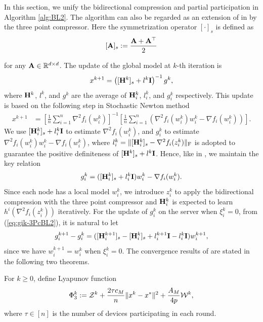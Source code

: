 \documentclass[11pt]{article}
\begin{document}
	
	In this section, we unify the bidirectional compression and partial participation in Algorithm \ref{alg:BL2}. The algorithm can also be regarded as an extension of  in \citep{qian2021basis} by the three point compressor. Here the symmetrization operator $[\cdot]_s$ is defined as
	$$
	[\mathbf{A}]_s \; { := }\; \frac{\mathbf{A} + \mathbf{A}^\top}{2}
	$$
	
	for any $\mathbf{A} \in \mathbb{R}^{d\times d}$. The update of the global model at $k$-th iteration is 
	$$
	x^{k+1} = \left(  [\mathbf{H}^k]_s + l^k\mathbf{I}  \right)^{-1} g^k, 
	$$
	where $\mathbf{H}^k$, $l^k$, and $g^k$ are the average of $\mathbf{H}_i^k$, $l_i^k$, and $g_i^k$ respectively. This update is based on the following step in Stochastic Newton method \citep{SN2019}
	\begin{align*}
		x^{k+1} &= \left[  \tfrac{1}{n} \sum_{i=1}^n \nabla^2 f_i(w_i^k)  \right]^{-1}  \left[  \tfrac{1}{n} \sum_{i=1}^n \left(  \nabla^2 f_i(w_i^k) w_i^k - \nabla f_i(w_i^k)  \right)  \right]. 
	\end{align*}
	We use $[\mathbf{H}_i^k]_s + l_i^k\mathbf{I}$ to estimate $\nabla^2 f_i(w_i^k)$, and $g_i^k$ to estimate $\nabla^2 f_i(w_i^k) w_i^k - \nabla f_i(w_i^k)$, where $l_i^k = \|[\mathbf{H}_i^k]_s-\nabla^2 f_i(z_i^k)\|_{\rm F}$ is adopted to guarantee the positive definiteness of $[\mathbf{H}^k]_s+l^k \mathbf{I}$. Hence, like  in \citep{qian2021basis}, we maintain the key relation 
	\begin{equation}\label{eq:gik-3PcBL2}
		g_i^k = ([\mathbf{H}_i^k]_s + l_i^k\mathbf{I}) w_i^k - \nabla f_i(w_i^k). 
	\end{equation}
	Since each node has a local model $w_i^k$, we introduce $z_i^k$ to apply the bidirectional compression with the three point compressor and $\mathbf{H}_i^k$ is expected to learn $h^i(\nabla^2 f_i(z_i^k))$ iteratively.
	For the update of $g_i^k$ on the server when $\xi_i^k=0$, from (\ref{eq:gik-3PcBL2}), it is natural to let $$g_i^{k+1} - g_i^k = ([\mathbf{H}_i^{k+1}]_s - [\mathbf{H}_i^k]_s + l_i^{k+1}\mathbf{I} - l_i^k\mathbf{I}) w_i^{k+1},$$ since we have $w_i^{k+1} = w_i^k$ when $\xi_i^k=0$. The convergence results of  are stated in the following two theorems. 
	
	
	
	For $k\geq 0$, define Lyapunov function $$\Phi_3^k \; { := }\; {\cal Z}^k + \frac{2\tau c_M}{n} \|x^k-x^*\|^2 + \frac{A_M}{4p} {\cal W}^k,$$ 
	where $\tau\in[n]$ is the number of devices participating in each round. 
	
\end{document}
